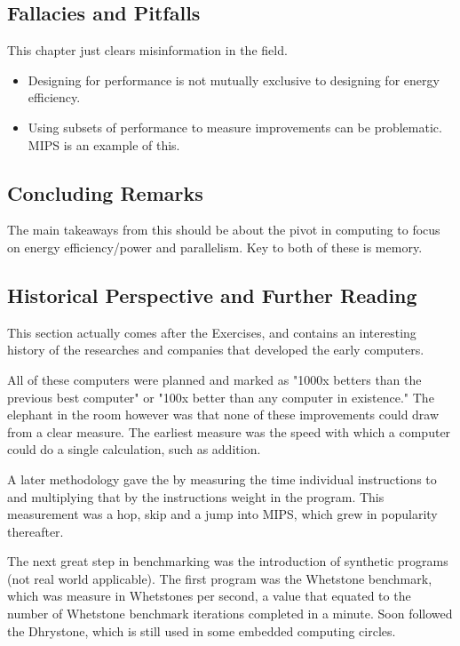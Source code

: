 \documentclass{article}
\begin{document}
{		\subsection{Fallacies and Pitfalls}
			This chapter just clears misinformation in the field.
			\begin{itemize}
				\item Designing for performance is not mutually exclusive to designing for energy efficiency.
				\item Using subsets of performance to measure improvements can be  problematic. MIPS is an example of this.
			\end{itemize}
		\subsection{Concluding Remarks}
			The main takeaways from this should be about the pivot in computing to focus on energy efficiency/power and parallelism. Key to both of these is memory.
		\subsection{Historical Perspective and Further Reading}
		
			This section actually comes after the Exercises, and contains an interesting history of the researches and companies that developed the early computers.
			
			All of these computers were planned and marked as "1000x betters than the previous best computer" or "100x better than any computer in existence." The elephant in the room however was that none of these improvements could draw from a clear measure. The earliest measure was the speed with which a computer could do a single calculation, such as addition.
			
			A later methodology gave the  by measuring the time individual instructions to and multiplying that by the instructions weight in the program. This measurement was a hop, skip and a jump into MIPS, which grew in popularity thereafter. 
			
			The next great step in benchmarking was the introduction of synthetic programs (not real world applicable). The first program was the Whetstone benchmark, which was measure in Whetstones per second, a value that equated to the number of Whetstone benchmark iterations completed in a minute. Soon followed the Dhrystone, which is still used in some embedded computing circles.
			
}
\end{document}
